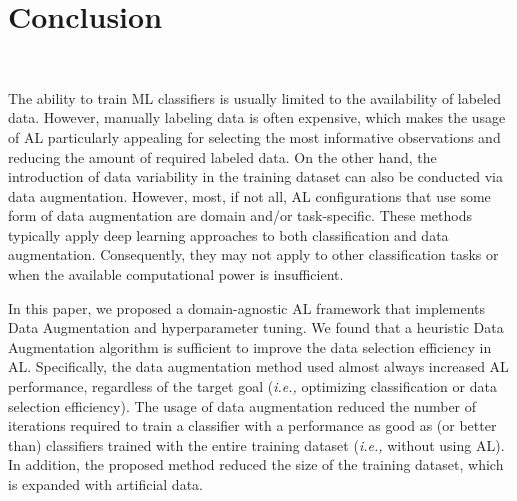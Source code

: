 \documentclass[10pt,journal,compsoc]{IEEEtran}
\begin{document}
\section{Conclusion}~\label{sec:conclusion}

The ability to train ML classifiers is usually limited to the availability of
labeled data. However, manually labeling data is often expensive, which makes
the usage of AL particularly appealing for selecting the most informative
observations and reducing the amount of required labeled data. On the other
hand, the introduction of data variability in the training dataset can also be
conducted via data augmentation. However, most, if not all, AL configurations
that use some form of data augmentation are domain and/or task-specific. These
methods typically apply deep learning approaches to both classification and
data augmentation. Consequently, they may not apply to other classification
tasks or when the available computational power is insufficient.

In this paper, we proposed a domain-agnostic AL framework that implements Data
Augmentation and hyperparameter tuning. We found that a heuristic Data
Augmentation algorithm is sufficient to improve the data selection efficiency
in AL\@. Specifically, the data augmentation method used almost always
increased AL performance, regardless of the target goal (\textit{i.e.,}
optimizing classification or data selection efficiency). The usage of data
augmentation reduced the number of iterations required to train a classifier
with a performance as good as (or better than) classifiers trained with the
entire training dataset (\textit{i.e.,} without using AL). In addition, the
proposed method reduced the size of the training dataset, which is expanded
with artificial data. 
\end{document}
